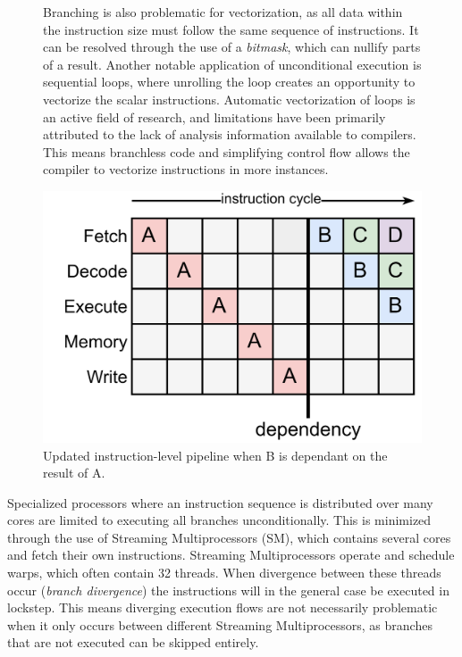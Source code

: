 \documentclass{article}
\begin{document}
\begin{figure}[ht]
    \begin{minipage}{.5\textwidth}
        Branching is also problematic for vectorization, as all data within the instruction size must follow the same sequence of instructions.
        It can be resolved through the use of a {\it bitmask}, which can nullify parts of a result\cite{assembly-optimizations}.  
        Another notable application of unconditional execution is sequential loops, where unrolling the loop creates an opportunity to vectorize the scalar instructions.
        Automatic vectorization of loops is an active field of research, and limitations have been primarily attributed to the lack of analysis information available to compilers\cite{automatic-vectorization}. 
        This means branchless code and simplifying control flow allows the compiler to vectorize instructions in more instances.   
    \end{minipage}%
    \begin{minipage}{.5\textwidth}
        \centering
        \includegraphics[scale=0.10]{UpdatedCycle.png}
        \captionsetup{margin=0.5cm}
        \captionsetup{format=plain}
        \caption
        { 
            Updated instruction-level pipeline when B is dependant on the result of A.
        }
    \end{minipage}
\end{figure}

\vspace{-0.5em}

Specialized processors where an instruction sequence is distributed over many cores are limited to executing all branches unconditionally.
This is minimized through the use of Streaming Multiprocessors (SM), which contains several cores and fetch their own instructions.
Streaming Multiprocessors operate and schedule warps, which often contain 32 threads.
When divergence between these threads occur ({\it branch divergence}) the instructions will in the general case be executed in lockstep\cite{threads-independent-scheduling}.
This means diverging execution flows are not necessarily problematic when it only occurs between different Streaming Multiprocessors, as branches that are not executed can be skipped entirely.
\end{document}
